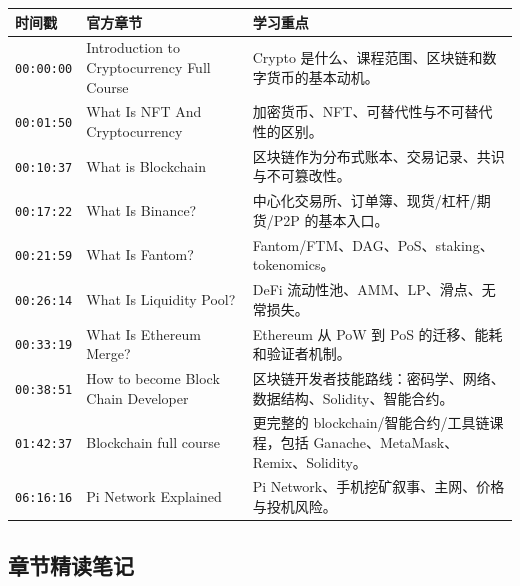 \documentclass[UTF8,11pt]{ctexart}
\newcommand{\timestamp}[1]{\textcolor{blue!50!black}{\texttt{#1}}}
\begin{document}
\begin{longtable}{>{\raggedright\arraybackslash}p{2.4cm}>{\raggedright\arraybackslash}p{5.2cm}>{\raggedright\arraybackslash}p{7.1cm}}
\toprule
\textbf{时间戳} & \textbf{官方章节} & \textbf{学习重点} \\
\midrule
\endhead
\timestamp{00:00:00} & Introduction to Cryptocurrency Full Course & Crypto 是什么、课程范围、区块链和数字货币的基本动机。 \\
\timestamp{00:01:50} & What Is NFT And Cryptocurrency & 加密货币、NFT、可替代性与不可替代性的区别。 \\
\timestamp{00:10:37} & What is Blockchain & 区块链作为分布式账本、交易记录、共识与不可篡改性。 \\
\timestamp{00:17:22} & What Is Binance? & 中心化交易所、订单簿、现货/杠杆/期货/P2P 的基本入口。 \\
\timestamp{00:21:59} & What Is Fantom? & Fantom/FTM、DAG、PoS、staking、tokenomics。 \\
\timestamp{00:26:14} & What Is Liquidity Pool? & DeFi 流动性池、AMM、LP、滑点、无常损失。 \\
\timestamp{00:33:19} & What Is Ethereum Merge? & Ethereum 从 PoW 到 PoS 的迁移、能耗和验证者机制。 \\
\timestamp{00:38:51} & How to become Block Chain Developer & 区块链开发者技能路线：密码学、网络、数据结构、Solidity、智能合约。 \\
\timestamp{01:42:37} & Blockchain full course & 更完整的 blockchain/智能合约/工具链课程，包括 Ganache、MetaMask、Remix、Solidity。 \\
\timestamp{06:16:16} & Pi Network Explained & Pi Network、手机挖矿叙事、主网、价格与投机风险。 \\
\bottomrule
\end{longtable}

\subsection{章节精读笔记}
\end{document}
